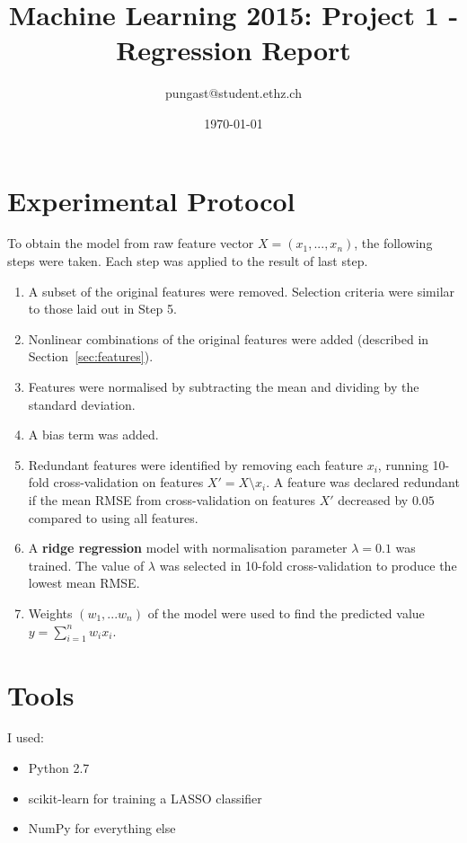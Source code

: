 \documentclass[a4paper, 11pt]{article}
\title{Machine Learning 2015: Project 1 - Regression Report}
\author{pungast@student.ethz.ch}
\date{\today}
\begin{document}
\maketitle

\section*{Experimental Protocol}

To obtain the model from raw feature vector $X = (x_1, ..., x_n)$, the following steps were taken. Each step was applied to the result of last step.

\begin{enumerate}
	\item A subset of the original features were removed. Selection criteria were similar to those laid out in Step 5.
	\item Nonlinear combinations of the original features were added (described in Section~\ref{sec:features}).
	\item Features were normalised by subtracting the mean and dividing by the standard deviation.
	\item A bias term was added.
	\item Redundant features were identified by removing each feature $x_i$, running 10-fold cross-validation on features $X' = X \setminus x_i$. A feature was declared redundant if the mean RMSE from cross-validation on features $X'$ decreased by $0.05$ compared to using all features.
	\item A \textbf{ridge regression} model with normalisation parameter $\lambda=0.1$ was trained. The value of $\lambda$ was selected in 10-fold cross-validation to produce the lowest mean RMSE.
	\item Weights $(w_1,...w_n)$ of the model were used to find the predicted value $y = \sum_{i=1}^{n} w_i x_i$.
\end{enumerate}

\section{Tools}
I used:

\begin{itemize}
	\item Python 2.7
	\item scikit-learn for training a LASSO classifier
	\item NumPy for everything else
\end{itemize}
\end{document}
